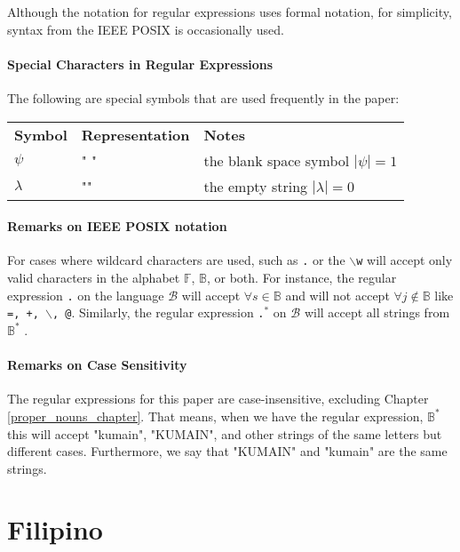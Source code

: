 Although the notation for regular expressions uses formal notation, for simplicity, syntax from the IEEE POSIX is occasionally used.

\paragraph{Special Characters in Regular Expressions} The following are special symbols that are used frequently in the paper:

\begin{center}
\begin{tabular}{l l l}
        \textbf{Symbol} & \textbf{Representation} & \textbf{Notes}                    \\
        $\psi$          & " "                     & the blank space symbol $|\psi|=1$ \\
        $\lambda$       & ""                      & the empty string $|\lambda| = 0$
    \end{tabular}
\end{center}

\paragraph{Remarks on IEEE POSIX notation} For cases where wildcard characters are used, such as \texttt{.} or the $\backslash$\texttt{w} will accept only valid characters in the alphabet $\mathbb{F}$, $\mathbb{B}$, or both. For instance, the regular expression \texttt{.} on the language $\mathcal{B}$ will accept $\forall s\in \mathbb{B}$ and will not accept $\forall j\notin \mathbb{B}$ like \texttt{=, +, $\backslash$, @}. Similarly, the regular expression \texttt{.$^*$} on $\mathcal{B}$ will accept all strings from $\mathbb{B}^*$ \cite{posix_standard}.

\paragraph{Remarks on Case Sensitivity} The regular expressions for this paper are case-insensitive, excluding Chapter \ref{proper_nouns_chapter}. That means, when we have the regular expression, $\mathbb{B}^*$ this will accept "kumain", "KUMAIN", and other strings of the same letters but different cases. Furthermore, we say that "KUMAIN" and "kumain" are the same strings.

\section{Filipino}
